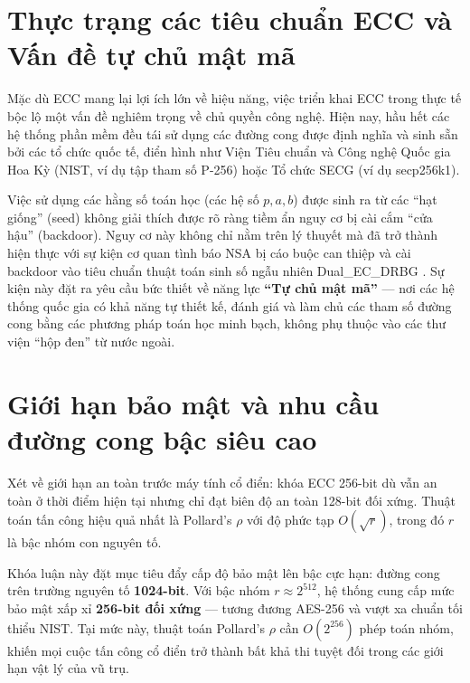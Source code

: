 \section{Thực trạng các tiêu chuẩn ECC và Vấn đề tự chủ mật
mã}\label{thux1ef1c-trux1ea1ng-cuxe1c-tiuxeau-chuux1ea9n-ecc-vuxe0-vux1ea5n-ux111ux1ec1-tux1ef1-chux1ee7-mux1eadt-muxe3}

Mặc dù ECC mang lại lợi ích lớn về hiệu năng, việc triển khai ECC trong
thực tế bộc lộ một vấn đề nghiêm trọng về chủ quyền công nghệ. Hiện nay,
hầu hết các hệ thống phần mềm đều tái sử dụng các đường cong được định
nghĩa và sinh sẵn bởi các tổ chức quốc tế, điển hình như Viện Tiêu chuẩn
và Công nghệ Quốc gia Hoa Kỳ (NIST, ví dụ tập tham số P-256) hoặc Tổ
chức SECG (ví dụ secp256k1).

Việc sử dụng các hằng số toán học (các hệ số \(p, a, b\)) được sinh ra
từ các ``hạt giống'' (seed) không giải thích được rõ ràng tiềm ẩn nguy
cơ bị cài cắm ``cửa hậu'' (backdoor). Nguy cơ này không chỉ nằm trên lý
thuyết mà đã trở thành hiện thực với sự kiện cơ quan tình báo NSA bị cáo
buộc can thiệp và cài backdoor vào tiêu chuẩn thuật toán sinh số ngẫu
nhiên Dual\_EC\_DRBG \citep{DualECDRBG}. Sự kiện này đặt ra yêu cầu bức
thiết về năng lực \textbf{``Tự chủ mật mã''} --- nơi các hệ thống quốc
gia có khả năng tự thiết kế, đánh giá và làm chủ các tham số đường cong
bằng các phương pháp toán học minh bạch, không phụ thuộc vào các thư
viện ``hộp đen'' từ nước ngoài.

\section{Giới hạn bảo mật và nhu cầu đường cong bậc siêu
cao}\label{giux1edbi-hux1ea1n-bux1ea3o-mux1eadt-vuxe0-nhu-cux1ea7u-ux111ux1b0ux1eddng-cong-bux1eadc-siuxeau-cao}

Xét về giới hạn an toàn trước máy tính cổ điển: khóa ECC 256-bit dù vẫn
an toàn ở thời điểm hiện tại nhưng chỉ đạt biên độ an toàn 128-bit đối
xứng. Thuật toán tấn công hiệu quả nhất là Pollard's \(\rho\)
\citep{PollardRho1978} với độ phức tạp \(O(\sqrt{r})\), trong đó \(r\)
là bậc nhóm con nguyên tố.

Khóa luận này đặt mục tiêu đẩy cấp độ bảo mật lên bậc cực hạn: đường
cong trên trường nguyên tố \textbf{1024-bit}. Với bậc nhóm
\(r \approx 2^{512}\), hệ thống cung cấp mức bảo mật xấp xỉ
\textbf{256-bit đối xứng} --- tương đương AES-256 và vượt xa chuẩn tối
thiểu NIST. Tại mức này, thuật toán Pollard's \(\rho\) cần
\(O(2^{256})\) phép toán nhóm, khiến mọi cuộc tấn công cổ điển trở thành
bất khả thi tuyệt đối trong các giới hạn vật lý của vũ trụ.

